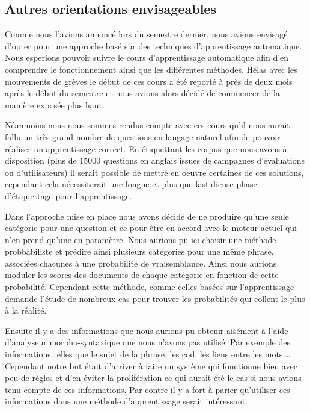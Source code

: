 \documentclass[10pt,a4paper]{article}
\begin{document}
\subsection{Autres orientations envisageables}
\par Comme nous l'avions annoncé lors du semestre dernier, nous avions envisagé d'opter pour une approche basé sur des techniques d'apprentissage automatique. Nous esperions pouvoir suivre le cours d'apprentissage automatique afin d'en comprendre le fonctionnement ainsi que les différentes méthodes. Hélas avec les mouvements de grèves le début de ces cours a été reporté à près de deux mois après le début du semestre et nous avions alors décidé de commencer de la manière exposée plus haut. 
\par Néanmoins nous nous sommes rendus compte avec ces cours qu'il nous aurait fallu un très grand nombre de questions en langage naturel afin de pouvoir réaliser un apprentissage correct. En étiquettant les corpus que nous avons à disposition (plus de 15000 questions en anglais issues de campagnes d'évaluations ou d'utilisateurs) il serait possible de mettre en oeuvre certaines de ces solutions, cependant cela nécessiterait une longue et plus que fastidieuse phase d'étiquettage pour l'apprentissage.
\par Dans l'approche mise en place nous avons décidé de ne produire qu'une seule catégorie pour une question et ce pour être en accord avec le moteur actuel qui n'en prend qu'une en paramètre. Nous aurions pu ici choisir une méthode probbabiliste et prédire ainsi plusieurs catégories pour une même phrase, associées chacunes à une probabilité de vraisemblance. Ainsi nous aurions moduler les scores des documents de chaque catégorie en fonction de cette probabilité. Cependant cette méthode, comme celles basées sur l'apprentissage demande l'étude de nombreux cas pour trouver les probabilités qui collent le plus à la réalité.
\par Ensuite il y a des informations que nous aurions pu obtenir aisément à l'aide d'analyseur morpho-syntaxique que nous n'avons pas utilisé. Par exemple des informations telles que le sujet de la phrase, les cod, les liens entre les mots,\ldots Cependant notre but était d'arriver à faire un système qui fonctionne bien avec peu de règles et d'en éviter la prolifération ce qui aurait été le cas si nous avions tenu compte de ces informations. Par contre il y a fort à parier qu'utiliser ces informations dans une méthode d'apprentissage serait intéressant.
\end{document}
